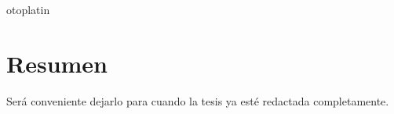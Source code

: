 otoplatin\documentclass[a4paper,openright,12pt]{report}
\begin{document}
\chapter*{Resumen} %

Será conveniente dejarlo para cuando la tesis ya esté redactada completamente.


\tableofcontents %


\cleardoublepage
{} %
\listoffigures %


\cleardoublepage
{} %
\listoftables %
\end{document}
